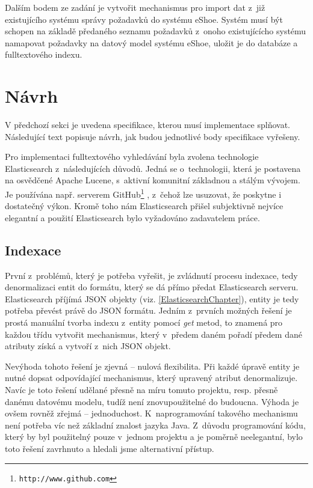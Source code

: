 \documentclass[11pt,oneside]{fithesis2}
\begin{document}
Dalším bodem ze zadání je vytvořit mechanismus pro import dat z~již existujícího systému správy požadavků do systému eShoe. Systém musí být schopen na základě předaného seznamu požadavků z~onoho existujícícho systému namapovat požadavky na datový model systému eShoe, uložit je do databáze a fulltextového indexu.

\section{Návrh}
V předchozí sekci je uvedena specifikace, kterou musí implementace splňovat. Následující text popisuje návrh, jak budou jednotlivé body specifikace vyřešeny. 

Pro implementaci fulltextového vyhledávání byla zvolena technologie Elasticsearch z~následujících důvodů. Jedná se o~technologii, která je postavena na osvědčené Apache Lucene, s~aktivní komunitní základnou a stálým vývojem. Je používána např. serverem GitHub\footnote{\texttt{http://www.github.com}} \cite{ElasticsearchDefinitiveGuide}, z~čehož lze usuzovat, že poskytne i dostatečný výkon. Kromě toho nám Elasticsearch přišel subjektivně nejvíce elegantní a použití Elasticsearch bylo vyžadováno zadavatelem práce.

\subsection{Indexace}
\label{NavrhIndexace}
První z~problémů, který je potřeba vyřešit, je zvládnutí procesu indexace, tedy denormalizaci entit do formátu, který se dá přímo předat Elasticsearch serveru. Elasticsearch příjímá JSON objekty (viz. \ref{ElasticsearchChapter}), entity je tedy potřeba převést právě do JSON formátu. Jedním z~prvních možných řešení je prostá manuální tvorba indexu z~entity pomocí \emph{get} metod, to znamená pro každou třídu vytvořit mechanismus, který v~předem daném pořadí předem dané atributy získá a vytvoří z~nich JSON objekt.

Nevýhoda tohoto řešení je zjevná -- nulová flexibilita. Při každé úpravě entity je nutné dopsat odpovídající mechanismus, který upravený atribut denormalizuje. Navíc je toto řešení udělané přesně na míru tomuto projektu, resp. přesně danému datovému modelu, tudíž není znovupoužitelné do budoucna. Výhoda je ovšem rovněž zřejmá -- jednoduchost. K~naprogramování takového mechanismu není potřeba víc než základní znalost jazyka Java. Z~důvodu programování kódu, který by byl použitelný pouze v~jednom projektu a je poměrně neelegantní, bylo toto řešení zavrhnuto a hledali jsme alternativní přístup.
\end{document}
